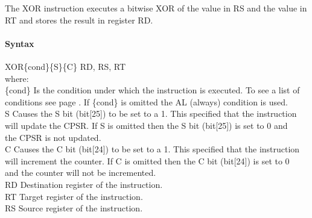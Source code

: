 \documentclass[12pt]{article}
\begin{document}
    \noindent
    The XOR instruction executes a bitwise XOR of the value in RS and the value in RT and stores the result in register RD. 
    
    \paragraph{Syntax}
    \begin{flushleft}
    XOR\{cond\}\{S\}\{C\} RD, RS, RT\\
    \vspace{1em}        %
    where:\\
    \vspace{1em}
    \{cond\}    \hspace{2em} Is the condition under which the instruction is executed. To see a list of\\
                \hspace{5.4em} conditions see page . If \{cond\} is omitted the AL (always) condition is used.\\
    \vspace{1em}    
    S       \hspace{4.5em} Causes the S bit (bit[25]) to be set to a 1. This specified that the instruction\\
            \hspace{5.4em} will update the CPSR. If S is omitted then the S bit (bit[25]) is set to 0 and\\
            \hspace{5.4em} the CPSR is not updated.\\
    \vspace{1em}    
    C       \hspace{4.5em} Causes the C bit (bit[24]) to be set to a 1. This specified that the instruction\\
            \hspace{5.4em} will increment the counter. If C is omitted then the C bit (bit[24]) is set to 0\\
            \hspace{5.4em} and the counter will not be incremented.\\
    \vspace{1em}
    RD  \hspace{3.6em} Destination register of the instruction.\\
    \vspace{1em}
    RT  \hspace{3.7em} Target register of the instruction.\\
    \vspace{1em}
    RS  \hspace{3.85em} Source register of the instruction.\\
    \end{flushleft}
    
\end{document}
